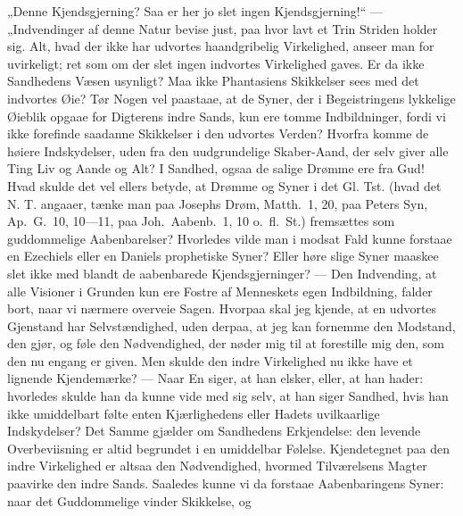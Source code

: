 \documentclass[12pt,a4paper]{book}
\begin{document}
„Denne Kjendsgjerning? Saa er her jo slet ingen Kjendsgjerning!“ --- „Indvendinger af
denne Natur bevise just, paa hvor lavt et Trin Striden holder sig. Alt, hvad der ikke
har udvortes haandgribelig Virkelighed, anseer man for uvirkeligt; ret som om der slet
ingen indvortes Virkelighed gaves. Er da ikke Sandhedens Væsen usynligt? Maa ikke
Phantasiens Skikkelser sees med det indvortes Øie? Tør Nogen vel paastaae, at de Syner,
der i Begeistringens lykkelige Øieblik opgaae for Digterens indre Sands, kun ere tomme
Indbildninger, fordi vi ikke forefinde saadanne Skikkelser i den udvortes Verden?
Hvorfra komme de høiere Indskydelser, uden fra den uudgrundelige Skaber-Aand, der selv
giver alle Ting Liv og Aande og Alt? I Sandhed, ogsaa de salige Drømme ere fra Gud! Hvad
skulde det vel ellers betyde, at Drømme og Syner i det Gl. Tst. (hvad det N. T. angaaer,
tænke man paa Josephs Drøm, Matth.\ 1, 20, paa Peters Syn,
Ap.\ G.\ 10, 10---11, paa Joh.\ Aabenb.\ 1, 10 o.\ fl.\ St.) fremsættes som
guddommelige Aabenbarelser? Hvorledes vilde man i modsat Fald kunne forstaae en
Ezechiels eller en Daniels prophetiske Syner? Eller høre slige Syner maaskee slet ikke
med blandt de aabenbarede Kjendsgjerninger? --- Den Indvending, at alle Visioner i
Grunden kun ere Fostre af Menneskets egen Indbildning, falder bort, naar vi nærmere
overveie Sagen. Hvorpaa skal jeg kjende, at en udvortes Gjenstand har Selvstændighed,
uden derpaa, at jeg kan fornemme den Modstand, den gjør, og føle den Nødvendighed, der
nøder mig til at forestille mig den, som den nu engang er given. Men skulde den indre
Virkelighed nu ikke have et lignende Kjendemærke? --- Naar En siger, at han elsker,
eller, at han hader: hvorledes skulde han da kunne vide med sig selv, at han siger
Sandhed, hvis han ikke umiddelbart følte enten Kjærlighedens eller Hadets uvilkaarlige
Indskydelser? Det Samme gjælder om Sandhedens Erkjendelse: den levende Overbeviisning er
altid begrundet i en umiddelbar Følelse. Kjendetegnet paa den indre Virkelighed er
altsaa den Nødvendighed, hvormed Tilværelsens Magter paavirke den indre Sands. Saaledes
kunne vi da forstaae Aabenbaringens Syner: naar det Guddommelige vinder Skikkelse, og
\end{document}
